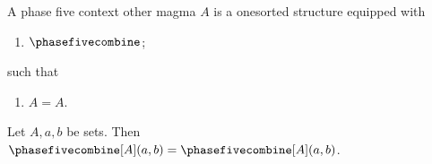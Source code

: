 

\begin{struct}\label{phase5_context_other_magma}
    A phase five context other magma $A$ is a onesorted structure equipped with
    \begin{enumerate}
        \item $\phasefivecombine$;
    \end{enumerate}
    such that
    \begin{enumerate}
        \item\label{phase5_context_other_refl} $A = A$.
    \end{enumerate}
\end{struct}

\begin{proposition}\label{phase5_context_ambiguous}
    Let $A,a,b$ be sets.
    Then $\phasefivecombine[A](a,b) = \phasefivecombine[A](a,b)$.
\end{proposition}
